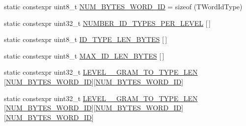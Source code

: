 \begin{DoxyCompactItemize}
\item 
static constexpr uint8\+\_\+t \hyperlink{classuva_1_1smt_1_1bpbd_1_1server_1_1lm_1_1m__grams_1_1m__gram__id_1_1_byte___m___gram___id_abfb2441a9e2b433ef183d2f979979122}{N\+U\+M\+\_\+\+B\+Y\+T\+E\+S\+\_\+\+W\+O\+R\+D\+\_\+\+I\+D} = sizeof (T\+Word\+Id\+Type)
\item 
static constexpr uint32\+\_\+t \hyperlink{classuva_1_1smt_1_1bpbd_1_1server_1_1lm_1_1m__grams_1_1m__gram__id_1_1_byte___m___gram___id_ade76de6674a38cc51d7ff5b5c8c8b9a0}{N\+U\+M\+B\+E\+R\+\_\+\+I\+D\+\_\+\+T\+Y\+P\+E\+S\+\_\+\+P\+E\+R\+\_\+\+L\+E\+V\+E\+L} \mbox{[}$\,$\mbox{]}
\item 
static constexpr uint8\+\_\+t \hyperlink{classuva_1_1smt_1_1bpbd_1_1server_1_1lm_1_1m__grams_1_1m__gram__id_1_1_byte___m___gram___id_ae3d32f4b5f983e8f034c494cdd87f065}{I\+D\+\_\+\+T\+Y\+P\+E\+\_\+\+L\+E\+N\+\_\+\+B\+Y\+T\+E\+S} \mbox{[}$\,$\mbox{]}
\item 
static constexpr uint8\+\_\+t \hyperlink{classuva_1_1smt_1_1bpbd_1_1server_1_1lm_1_1m__grams_1_1m__gram__id_1_1_byte___m___gram___id_a362678edc27ef4ef3b78d0b747e0466c}{M\+A\+X\+\_\+\+I\+D\+\_\+\+L\+E\+N\+\_\+\+B\+Y\+T\+E\+S} \mbox{[}$\,$\mbox{]}
\item 
static constexpr uint32\+\_\+t \hyperlink{classuva_1_1smt_1_1bpbd_1_1server_1_1lm_1_1m__grams_1_1m__gram__id_1_1_byte___m___gram___id_a8e00ffa9494f8bd246b2c7b874ae929a}{L\+E\+V\+E\+L\+\_\+\_\+\+G\+R\+A\+M\+\_\+\+T\+O\+\_\+\+T\+Y\+P\+E\+\_\+\+L\+E\+N} \mbox{[}\hyperlink{classuva_1_1smt_1_1bpbd_1_1server_1_1lm_1_1m__grams_1_1m__gram__id_1_1_byte___m___gram___id_abfb2441a9e2b433ef183d2f979979122}{N\+U\+M\+\_\+\+B\+Y\+T\+E\+S\+\_\+\+W\+O\+R\+D\+\_\+\+I\+D}\mbox{]}\mbox{[}\hyperlink{classuva_1_1smt_1_1bpbd_1_1server_1_1lm_1_1m__grams_1_1m__gram__id_1_1_byte___m___gram___id_abfb2441a9e2b433ef183d2f979979122}{N\+U\+M\+\_\+\+B\+Y\+T\+E\+S\+\_\+\+W\+O\+R\+D\+\_\+\+I\+D}\mbox{]}
\item 
static constexpr uint32\+\_\+t \hyperlink{classuva_1_1smt_1_1bpbd_1_1server_1_1lm_1_1m__grams_1_1m__gram__id_1_1_byte___m___gram___id_abae28df1e61ace6a2076025e9adede10}{L\+E\+V\+E\+L\+\_\+\_\+\+G\+R\+A\+M\+\_\+\+T\+O\+\_\+\+T\+Y\+P\+E\+\_\+\+L\+E\+N} \mbox{[}\hyperlink{classuva_1_1smt_1_1bpbd_1_1server_1_1lm_1_1m__grams_1_1m__gram__id_1_1_byte___m___gram___id_abfb2441a9e2b433ef183d2f979979122}{N\+U\+M\+\_\+\+B\+Y\+T\+E\+S\+\_\+\+W\+O\+R\+D\+\_\+\+I\+D}\mbox{]}\mbox{[}\hyperlink{classuva_1_1smt_1_1bpbd_1_1server_1_1lm_1_1m__grams_1_1m__gram__id_1_1_byte___m___gram___id_abfb2441a9e2b433ef183d2f979979122}{N\+U\+M\+\_\+\+B\+Y\+T\+E\+S\+\_\+\+W\+O\+R\+D\+\_\+\+I\+D}\mbox{]}\mbox{[}\hyperlink{classuva_1_1smt_1_1bpbd_1_1server_1_1lm_1_1m__grams_1_1m__gram__id_1_1_byte___m___gram___id_abfb2441a9e2b433ef183d2f979979122}{N\+U\+M\+\_\+\+B\+Y\+T\+E\+S\+\_\+\+W\+O\+R\+D\+\_\+\+I\+D}\mbox{]}

\end{DoxyCompactItemize}

